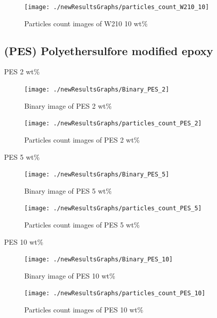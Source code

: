 \documentclass[numbers=noendperiod,chapterprefix=on]{icldt} %
\begin{document}
\begin{figure}[!hp]
\centering
\texttt{[image: ./newResultsGraphs/particles\_count\_W210\_10]}
\caption{Particles count images of W210 10 wt\%} \label{particles_count_W210_10}
\end{figure}
\FloatBarrier

\subsection{(PES) Polyethersulfore modified epoxy}

PES 2 wt\%

\begin{figure}[!hp]
\centering
\texttt{[image: ./newResultsGraphs/Binary\_PES\_2]}
\caption{Binary image of PES 2 wt\%} \label{Binary_PES_2}
\end{figure}
\FloatBarrier

\begin{figure}[!hp]
\centering
\texttt{[image: ./newResultsGraphs/particles\_count\_PES\_2]}
\caption{Particles count images of PES 2 wt\%} \label{particles_count_PES_2}
\end{figure}
\FloatBarrier


PES 5 wt\%

\begin{figure}[!hp]
\centering
\texttt{[image: ./newResultsGraphs/Binary\_PES\_5]}
\caption{Binary image of PES 5 wt\%} \label{Binary_PES_5}
\end{figure}
\FloatBarrier

\begin{figure}[!hp]
\centering
\texttt{[image: ./newResultsGraphs/particles\_count\_PES\_5]}
\caption{Particles count images of PES 5 wt\%} \label{particles_count_PES_5}
\end{figure}
\FloatBarrier

PES 10 wt\%

\begin{figure}[!hp]
\centering
\texttt{[image: ./newResultsGraphs/Binary\_PES\_10]}
\caption{Binary image of PES 10 wt\%} \label{Binary_PES_10}
\end{figure}
\FloatBarrier

\begin{figure}[!hp]
\centering
\texttt{[image: ./newResultsGraphs/particles\_count\_PES\_10]}
\caption{Particles count images of PES 10 wt\%} \label{particles_count_PES_10}
\end{figure}
\FloatBarrier


\end{document}
